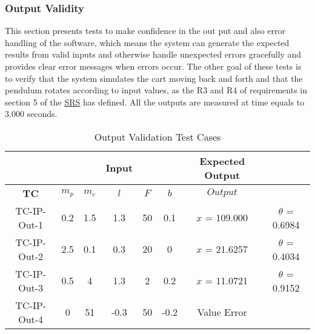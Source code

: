 \documentclass[12pt, titlepage]{article}
\begin{document}
\subsubsection{Output Validity \label{out_val}}

This section presents tests to make confidence in the out put and also error handling of the software, which means the system can generate the expected results from valid inputs and otherwise handle unexpected errors gracefully and provides clear error messages when errors occur.
The other goal of these tests is to verify that the system simulates the cart moving back and forth and that the pendulum rotates according to input values, as the R3 and R4 of requirements in section 5 of the  \href{https://github.com/MinMah23/CAS741-Project/tree/main/docs/SRS/SRS.pdf}{SRS} has defined.
All the outputs are measured at time equals to 3.000 seconds.

\begin{table}[ht]
\centering
\caption{Output Validation Test Cases} \label{tbl_output}
\vspace*{2mm}
 \begin{tabular}{|c|c c c c c| c c|} 
 \hline
   & &&\textbf{Input} &&  &\textbf{Expected Output}& \\ \hline
\textbf{TC} &   $m_p$ & $m_c$ & $l$ & $F$ & $b$  &    $Output$ &\\ \hline
TC-IP-Out-1 &0.2 & 1.5& 1.3& 50 & 0.1 &  $x$ = 109.000 & $\theta$ =  0.6984\\
 \hline
TC-IP-Out-2&2.5& 0.1&0.3&20&0& $x$ = 21.6257 & $\theta$ = 0.4034\\
 \hline
TC-IP-Out-3  &0.5& 4&1.3&2&0.2& $x$ =  11.0721 & $\theta$ = 0.9152\\
 \hline
TC-IP-Out-4 &0 & 51& -0.3& 50& -0.2 & Value Error &\\ \hline

\end{tabular}

\end{table}		
\end{document}
